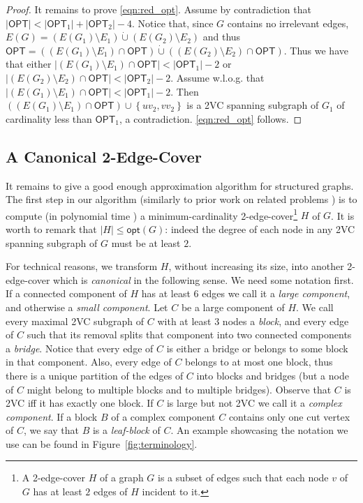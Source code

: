 \documentclass{theoretics}
\newcommand{\OPT}{\mathsf{OPT}}
\newcommand{\opt}{\mathsf{opt}}
\newcommand{\set}[1]{\left\{#1 \right\}}
\begin{document}
\begin{proof}
It remains to prove \eqref{eqn:red_opt}. Assume by contradiction that $|\OPT|< |\OPT_1| + |\OPT_2| - 4$. Notice that, since $G$ contains no irrelevant edges, $E(G)=(E(G_1)\setminus E_1)\dot\cup (E(G_2)\setminus E_2)$ and thus $\OPT=((E(G_1)\setminus E_1)\cap \OPT)\dot\cup((E(G_2)\setminus E_2)\cap\OPT)$. Thus we have that either $|(E(G_1)\setminus E_1)\cap\OPT|<|\OPT_1|-2$ or $|(E(G_2)\setminus E_2)\cap\OPT|<|\OPT_2|-2$. Assume w.l.o.g. that $|(E(G_1)\setminus E_1)\cap\OPT|<|\OPT_1|-2$. Then $((E(G_1)\setminus E_1)\cap\OPT)\cup\set{uv_2,vv_2}$ is a 2VC spanning subgraph of $G_1$ of cardinality less than $\OPT_1$, a contradiction. \eqref{eqn:red_opt} follows.
\end{proof}

\subsection{A Canonical 2-Edge-Cover}
\label{sec:overview:canonical}

It remains to give a good enough approximation algorithm for structured graphs. The first step in our algorithm (similarly to prior work on related problems \cite{CDGKN20,GGJ23,HVV19}) is to compute (in polynomial time \cite[Chapter~30]{S03}) a minimum-cardinality 2-edge-cover\footnote{A 2-edge-cover $H$ of a graph $G$ is a subset of edges such that each node $v$ of $G$ has at least $2$ edges of $H$ incident to it.} $H$ of $G$. It is worth to remark that $|H|\leq \opt(G)$: indeed the degree of each node in any 2VC spanning subgraph of $G$ must be at least $2$. 

For technical reasons, we transform $H$, without increasing its size, into another 2-edge-cover which is \emph{canonical} in the following sense. We need some notation first. If a connected component of $H$ has at least $6$ edges we call it a \emph{large component}, and otherwise a \emph{small component}. Let $C$ be a large component of $H$. We call every maximal 2VC subgraph of $C$ with at least $3$ nodes a \emph{block}, and every edge of $C$ such that its removal splits that component into two connected components a \emph{bridge}. Notice that every edge of $C$ is either a bridge or belongs to some block in that component. Also, every edge of $C$ belongs to at most one block, thus there is a unique partition of the edges of $C$ into blocks and bridges (but a node of $C$ might belong to multiple blocks and to multiple bridges). Observe that $C$ is 2VC iff it has exactly one block. If $C$ is large but not 2VC we call it a \emph{complex component}. If a block $B$ of a complex component $C$ contains only one cut vertex of $C$, we say that $B$ is a \emph{leaf-block} of $C$. An example showcasing the notation we use can be found in Figure~\ref{fig:terminology}.
\end{document}
